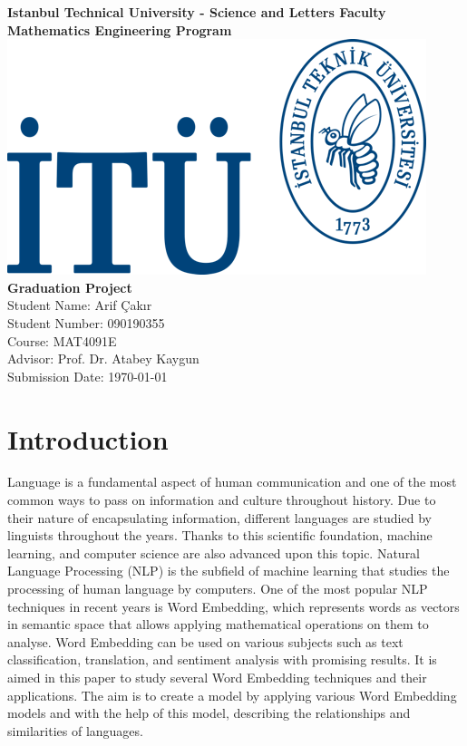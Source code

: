 \documentclass[man]{apa7}
\begin{document}
\begin{titlepage}
\centering
{\large \textbf{ Istanbul Technical University - Science and Letters Faculty}}\\
{\large \textbf{Mathematics Engineering Program}}\\[4\baselineskip]
\includegraphics[scale = 1.5]{itülogo.png}\\[6\baselineskip]
{\LARGE \textbf{Graduation Project}}\\[2\baselineskip]

{\Large Student Name: Arif Çakır}\\
{\large Student Number: 090190355}\\
{\large Course: MAT4091E}\\
{\large Advisor: Prof. Dr. Atabey Kaygun}\\
{\large Submission Date: \today}\\
\end{titlepage}
\tableofcontents
\pagebreak

\section{Introduction}

Language is a fundamental aspect of human communication and one of the most common ways to pass on information and culture throughout history. Due to their nature of encapsulating information, different languages are studied by linguists throughout the years. Thanks to this scientific foundation, machine learning, and computer science are also advanced upon this topic. Natural Language Processing (NLP) is the subfield of machine learning that studies the processing of human language by computers. One of the most popular NLP techniques in recent years is Word Embedding, which represents words as vectors in semantic space that allows applying mathematical operations on them to analyse. Word Embedding can be used on various subjects such as text classification, translation, and sentiment analysis with promising results. It is aimed in this paper to study several Word Embedding techniques and their applications. The aim is to create a model by applying various Word Embedding models and with the help of this model, describing the relationships and similarities of languages.
\end{document}
